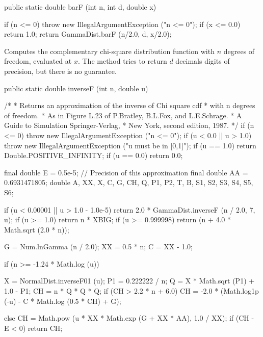 \begin{code}

   public static double barF (int n, int d, double x)\begin{hide} {
      if (n <= 0)
        throw new IllegalArgumentException ("n <= 0");
      if (x <= 0.0)
         return 1.0;
      return GammaDist.barF (n/2.0, d, x/2.0);
   }\end{hide}
\end{code}
\begin{tabb}
  Computes the complementary chi-square distribution function with $n$ degrees
 of freedom, evaluated at $x$. The method tries to return $d$ decimals digits
 of precision,  but there is no guarantee.
\end{tabb}
\begin{code}

   public static double inverseF (int n, double u)\begin{hide} {
      /*
       * Returns an approximation of the inverse of Chi square cdf
       * with n degrees of freedom.
       * As in Figure L.23 of P.Bratley, B.L.Fox, and L.E.Schrage.
       *    A Guide to Simulation Springer-Verlag,
       *    New York, second edition, 1987.
       */
      if (n <= 0)
         throw new IllegalArgumentException ("n <= 0");
      if (u < 0.0 || u > 1.0)
         throw new IllegalArgumentException ("u must be in [0,1]");
      if (u == 1.0)
         return Double.POSITIVE_INFINITY;
      if (u == 0.0)
         return 0.0;

      final double E = 0.5e-5;    // Precision of this approximation
      final double AA = 0.6931471805;
      double A, XX, X, C, G, CH, Q, P1, P2, T, B, S1, S2, S3, S4, S5, S6;

      if (u < 0.00001 || u > 1.0 - 1.0e-5)
         return 2.0 * GammaDist.inverseF (n / 2.0, 7, u);
      if (u >= 1.0)
         return n * XBIG;
      if (u >= 0.999998)
         return (n + 4.0 * Math.sqrt (2.0 * n));

      G = Num.lnGamma (n / 2.0);
      XX = 0.5 * n;
      C = XX - 1.0;

      if (n >= -1.24 * Math.log (u)) {
         X = NormalDist.inverseF01 (u);
         P1 = 0.222222 / n;
         Q = X * Math.sqrt (P1) + 1.0 - P1;
         CH = n * Q * Q * Q;
         if (CH > 2.2 * n + 6.0)
            CH = -2.0 * (Math.log1p (-u) - C * Math.log (0.5 * CH) + G);

      } else {
         CH = Math.pow (u * XX * Math.exp (G + XX * AA), 1.0 / XX);
         if (CH - E < 0)
            return CH;
      }

}
\end{hide}
\end{code}
